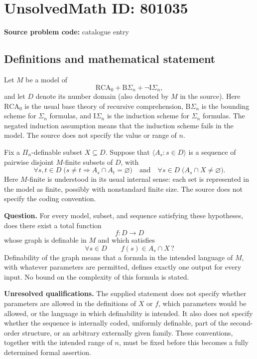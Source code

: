 \documentclass[11pt]{article}
\begin{document}
\section*{UnsolvedMath ID: 801035}
\textbf{Source problem code:} catalogue entry
\subsection{Definitions and mathematical statement}
Let \(M\) be a model of
\[
\mathrm{RCA}_0+\mathrm{B}\Sigma_n+\neg\mathrm{I}\Sigma_n,
\]
and let \(D\) denote its number domain (also denoted by \(M\) in the source). Here \(\mathrm{RCA}_0\) is the usual base theory of recursive comprehension, \(\mathrm{B}\Sigma_n\) is the bounding scheme for \(\Sigma_n\) formulas, and \(\mathrm{I}\Sigma_n\) is the induction scheme for \(\Sigma_n\) formulas. The negated induction assumption means that the induction scheme fails in the model. The source does not specify the value or range of \(n\).

Fix a \(\Pi_n\)-definable subset \(X\subseteq D\). Suppose that \(\langle A_s:s\in D\rangle\) is a sequence of pairwise disjoint \(M\)-finite subsets of \(D\), with
\[
\forall s,t\in D\;\bigl(s\ne t\Longrightarrow A_s\cap A_t=\varnothing\bigr)
\quad\text{and}\quad
\forall s\in D\;\bigl(A_s\cap X\ne\varnothing\bigr).
\]
Here \(M\)-finite is understood in its usual internal sense: each set is represented in the model as finite, possibly with nonstandard finite size. The source does not specify the coding convention.

\textbf{Question.} For every model, subset, and sequence satisfying these hypotheses, does there exist a total function
\[
f:D\longrightarrow D
\]
whose graph is definable in \(M\) and which satisfies
\[
\forall s\in D\qquad f(s)\in A_s\cap X\,?
\]
Definability of the graph means that a formula in the intended language of \(M\), with whatever parameters are permitted, defines exactly one output for every input. No bound on the complexity of this formula is stated.

\textbf{Unresolved qualifications.} The supplied statement does not specify whether parameters are allowed in the definitions of \(X\) or \(f\), which parameters would be allowed, or the language in which definability is intended. It also does not specify whether the sequence is internally coded, uniformly definable, part of the second-order structure, or an arbitrary externally given family. These conventions, together with the intended range of \(n\), must be fixed before this becomes a fully determined formal assertion.
\end{document}
